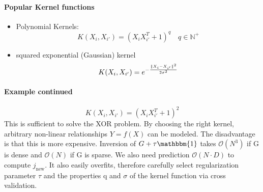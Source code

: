 \documentclass[11pt]{article}
\DeclarePairedDelimiter\norm{\lVert}{\rVert}
\begin{document}
    \noindent \paragraph{Popular Kernel functions}
    \begin{itemize}
      \item Polynomial Kernels:
      \begin{equation*}
        K(X_i, X_{i'})=(X_iX_{i'}^T+1)^q \quad q \in \mathbb{N}^+
      \end{equation*}
      \item squared exponential (Gaussian) kernel
      \begin{equation*}
        K(X_i, X_{i'})=e^{-\frac{\norm{X_i-X_{i'}}^2}{2\sigma^2}}
      \end{equation*}
    \end{itemize}
    \noindent \paragraph{Example continued}
    \begin{equation*}
      K(X_i, X_{i'})=(X_iX_{i'}^T+1)^2
    \end{equation*}
    This is sufficient to solve the XOR problem. By choosing the right kernel, arbitrary
    non-linear relationships $Y=f(X)$ can be modeled. The disadvantage is that
    this is more expensive. Inversion of $G+\tau \mathbbm{1}$ takes $\mathcal{O}(N^3)$
    if G is dense and $\mathcal{O}(N)$ if G is sparse. We also need prediction $
    \mathcal{O}(N\cdot D)$ to compute $j_{\text{new}}$. It also easily overfits,
    therefore carefully select regularization parameter $\tau$ and the properties
    q and $\sigma$ of the kernel function via cross validation.


























  
\end{document}
